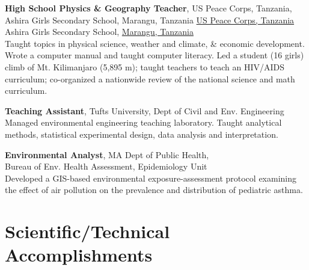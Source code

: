 \documentclass[11pt]{article}
\begin{document}
\begin{description}[style=multiline,leftmargin=2.5cm,font=\normalfont]
\item[2000--2002] \textbf{High School Physics \& Geography Teacher},
	{US Peace Corps, Tanzania}, Ashira Girls Secondary School, {Marangu, Tanzania}
	\href{http://www.peacecorps.gov/index.cfm?shell=learn.wherepc.africa.tanzania}
	{US Peace Corps, Tanzania}\\
	Ashira Girls Secondary School,
	\href{http://g.co/maps/nmzu7}{Marangu, Tanzania}\\
	Taught topics in physical science, weather and climate, \& economic development.
	Wrote a computer manual and taught computer literacy.
	Led a student (16 girls) climb of Mt. Kilimanjaro (5,895 m);
	taught teachers to teach an HIV/AIDS curriculum;
	co-organized a nationwide review of
	the national science and math curriculum.

\item[1998--2000] \textbf{Teaching Assistant}, Tufts University,
	Dept of Civil and Env. Engineering
	Managed environmental engineering teaching laboratory.
	Taught analytical methods, statistical experimental design,
	data analysis and interpretation.


\item[1999] \textbf{Environmental Analyst},
	MA Dept of Public Health,\\ Bureau of Env. Health Assessment, Epidemiology Unit\\
	Developed a GIS-based environmental exposure-assessment protocol
	examining the effect of air pollution on the
	prevalence and distribution of pediatric asthma.

\end{description}


\section{Scientific/Technical Accomplishments}
\end{document}
